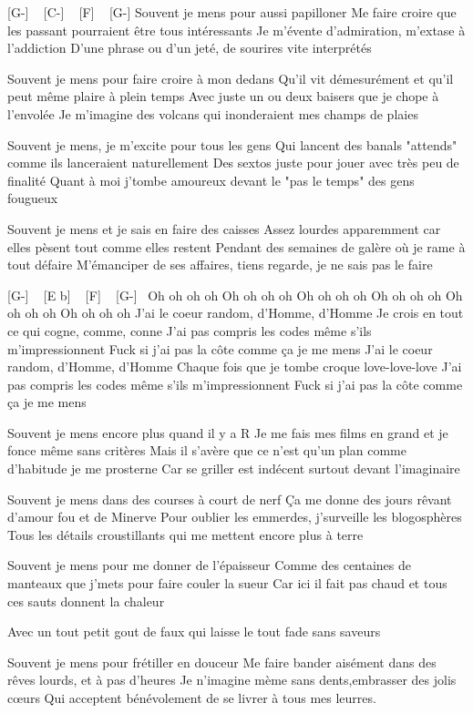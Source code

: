 [G-] ~ [C-] ~ [F] ~ [G-]
Souvent je mens pour aussi papilloner
Me faire croire que les passant pourraient être tous intéressants
Je m'évente d'admiration, m'extase à l'addiction
D'une phrase ou d'un jeté, de sourires vite interprétés

Souvent je mens pour faire croire à mon dedans
Qu'il vit démesurément et qu'il peut même plaire à plein temps
Avec juste un ou deux baisers que je chope à l'envolée
Je m'imagine des volcans qui inonderaient mes champs de plaies


Souvent je mens, je m'excite pour tous les gens
Qui lancent des banals "attends" comme ils lanceraient naturellement
Des sextos juste pour jouer avec très peu de finalité
Quant à moi j'tombe amoureux devant le "pas le temps" des gens fougueux

Souvent je mens et je sais en faire des caisses
Assez lourdes apparemment car elles pèsent tout comme elles restent
Pendant des semaines de galère où je rame à tout défaire
M'émanciper de ses affaires, tiens regarde, je ne sais pas le faire

[G-] ~ [E b] ~ [F]  ~ [G-]~ 
Oh oh oh oh
Oh oh oh oh
Oh oh oh oh
Oh oh oh oh
Oh oh oh oh
Oh oh oh oh
J'ai le coeur random, d'Homme, d'Homme
Je crois en tout ce qui cogne, comme, conne
J'ai pas compris les codes même s'ils m'impressionnent
Fuck si j'ai pas la côte comme ça je me mens
J'ai le coeur random, d'Homme, d'Homme
Chaque fois que je tombe croque love-love-love
J'ai pas compris les codes même s'ils m'impressionnent
Fuck si j'ai pas la côte comme ça je me mens

Souvent je mens encore plus quand il y a R
Je me fais mes films en grand et je fonce même sans critères
Mais il s'avère que ce n'est qu'un plan comme d'habitude je me prosterne
Car se griller est indécent surtout devant l'imaginaire

Souvent je mens dans des courses à court de nerf
Ça me donne des jours rêvant d'amour fou et de Minerve
Pour oublier les emmerdes, j'surveille les blogosphères
Tous les détails croustillants qui me mettent encore plus à terre

Souvent je mens pour me donner de l'épaisseur
Comme des centaines de manteaux que j'mets pour faire couler la sueur
Car ici il fait pas chaud et tous ces sauts donnent la chaleur

Avec un tout petit gout de faux qui laisse le tout fade sans saveurs

Souvent je mens pour frétiller en douceur
Me faire bander aisément dans des rêves lourds, et à pas d'heures
Je n'imagine mème sans dents,embrasser des jolis cœurs
Qui acceptent bénévolement de se livrer à tous mes leurres.

